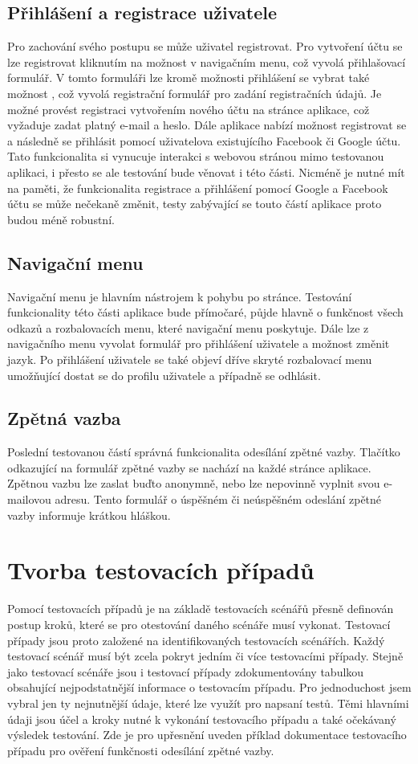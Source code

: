 \documentclass[
    color,   %
	table,   %
    twoside, %
]{fithesis3}
\begin{document}
\subsection{Přihlášení a registrace uživatele}
Pro zachování svého postupu se může uživatel registrovat. Pro vytvoření účtu se lze registrovat kliknutím na možnost  v navigačním menu, což vyvolá přihlašovací formulář. V tomto formuláři lze kromě možnosti přihlášení se vybrat také možnost , což vyvolá registrační formulář pro zadání registračních údajů. Je možné provést registraci vytvořením nového účtu na stránce aplikace, což vyžaduje zadat platný e-mail a heslo. Dále aplikace nabízí možnost registrovat se a následně se přihlásit pomocí uživatelova existujícího Facebook či Google účtu. Tato funkcionalita si vynucuje interakci s webovou stránou mimo testovanou aplikaci, i přesto se ale testování bude věnovat i této části. Nicméně je nutné mít na paměti, že funkcionalita registrace a přihlášení pomocí Google a Facebook účtu se může nečekaně změnit, testy zabývající se touto částí aplikace proto budou méně robustní.

\subsection{Navigační menu}
Navigační menu je hlavním nástrojem k pohybu po stránce. Testování funkcionality této části aplikace bude přímočaré, půjde hlavně o funkčnost všech odkazů a rozbalovacích menu, které navigační menu poskytuje. Dále lze z navigačního menu vyvolat formulář pro přihlášení uživatele a možnost změnit jazyk. Po přihlášení uživatele se také objeví dříve skryté rozbalovací menu umožňující dostat se do profilu uživatele a případně se odhlásit.

\subsection{Zpětná vazba}
Poslední testovanou částí správná funkcionalita odesílání zpětné vazby. Tlačítko odkazující na formulář zpětné vazby se nachází na každé stránce aplikace. Zpětnou vazbu lze zaslat buďto anonymně, nebo lze nepovinně vyplnit svou e-mailovou adresu. Tento formulář o úspěšném či neúspěšném odeslání zpětné vazby informuje krátkou hláškou.

\section{Tvorba testovacích případů}
Pomocí testovacích případů je na základě testovacích scénářů přesně definován postup kroků, které se pro otestování daného scénáře musí vykonat. Testovací případy jsou proto založené na identifikovaných testovacích scénářích. Každý testovací scénář musí být zcela pokryt jedním či více testovacími případy. Stejně jako testovací scénáře jsou i testovací případy zdokumentovány tabulkou obsahující nejpodstatnější informace o testovacím případu. Pro jednoduchost jsem vybral jen ty nejnutnější údaje, které lze využít pro napsaní testů. Těmi hlavními údaji jsou účel a kroky nutné k vykonání testovacího případu a také očekávaný výsledek testování. Zde je pro upřesnění uveden příklad dokumentace testovacího případu pro ověření funkčnosti odesílání zpětné vazby.
\end{document}
